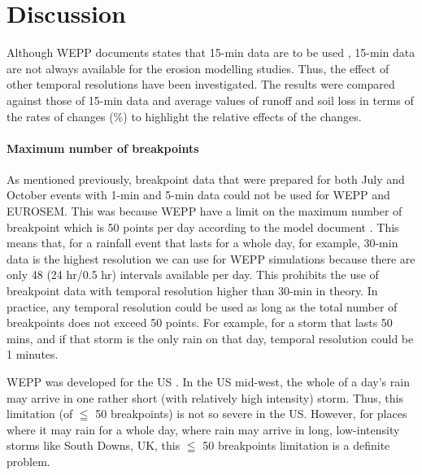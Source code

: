 \section{Discussion}
\label{sec:TemporalScalesDiscussion}

Although WEPP documents states that 15-min data are to be used
\citep{flanagan1995-weppusersummary}, 15-min data are not always available for
the erosion modelling studies. Thus, the effect of other temporal resolutions
have
been investigated. The results were compared against those of 15-min data and
average values of runoff and soil loss in terms of the rates of changes (\%) to
highlight the relative effects of the changes.

\paragraph{Maximum number of breakpoints} As mentioned previously, breakpoint
data that were prepared for both July and October events with 1-min and 5-min
data could not be used for WEPP and EUROSEM. This was because WEPP have a limit
on the maximum number of breakpoint which is 50 points per day according to the
model document \citep[see][page 10]{flanagan1995-weppusersummary}. This means
that, for a rainfall event that lasts for a whole day, for example, 30-min data
is the highest resolution we can use for WEPP simulations because there are only
48 (24 hr/0.5 hr) intervals available per day. This prohibits the use of
breakpoint data with temporal resolution higher than 30-min in theory. In
practice, any temporal resolution could be used as long as the total number of
breakpoints does not exceed 50 points. For example, for a storm that lasts 50
mins, and if that storm is the only rain on that day, temporal resolution could
be 1 minutes.

WEPP was developed for the US \citep{flanagan2007-1603}. In the US mid-west, the
whole of a day's rain may arrive in one rather short (with relatively high
intensity) storm. Thus, this limitation (of $\leqq$ 50 breakpoints) is not so
severe in the US. However, for places where it may rain for a whole day, where
rain may arrive in long, low-intensity storms like South Downs, UK, this $\leqq$
50 breakpoints limitation is a definite problem.

